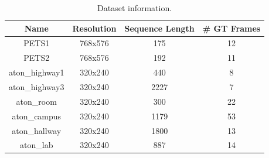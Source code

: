 \begin{table}
\centering
\caption{Dataset information.}
\begin{tabular}{ |c|c|c|c| }
	\hline
	\textbf{Name} & \textbf{Resolution} & \textbf{Sequence Length} & \textbf{\# GT Frames} \\
	\hline
	\hline
	PETS1 & 768x576 & 175 & 12 \\
	\hline
	PETS2 & 768x576 & 192 & 11 \\
	\hline
	aton\_highway1 & 320x240 & 440 & 8 \\
	\hline 
	aton\_highway3 & 320x240 & 2227 & 7 \\ 
	\hline
	aton\_room & 320x240 & 300 & 22 \\ 
	\hline
	aton\_campus & 320x240 & 1179 & 53 \\ 
	\hline
	aton\_hallway & 320x240 & 1800 & 13 \\
	\hline
	aton\_lab & 320x240 & 887 & 14 \\ 
	\hline
\end{tabular}

\label{table:datasets}
\end{table}

